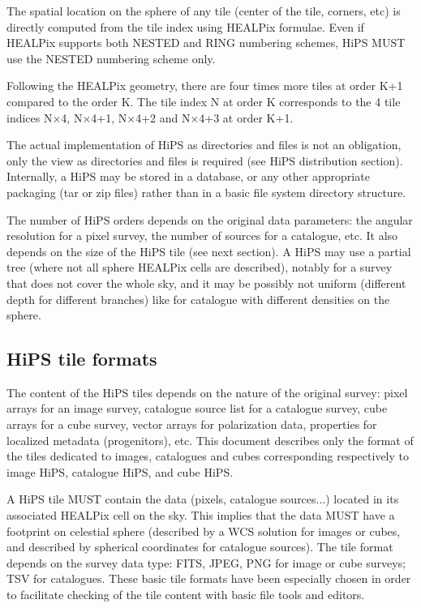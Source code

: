 \documentclass[11pt,a4paper]{ivoa}
\begin{document}
The spatial location on the sphere of any tile (center of the tile, corners, etc) is directly computed from the tile index using HEALPix formulae. Even if HEALPix supports both NESTED and RING numbering schemes, HiPS MUST use the NESTED numbering scheme only.

Following the HEALPix geometry, there are four times more tiles at order K+1 compared to the order K. The tile index N at order K corresponds to the 4 tile indices N×4, N×4+1, N×4+2 and N×4+3 at order K+1.

The actual implementation of HiPS as directories and files is not an obligation, only the view as directories and files is required (see HiPS distribution section). Internally, a HiPS may be stored in a database, or any other appropriate packaging (tar or zip files) rather than in a basic file system directory structure.

The number of HiPS orders depends on the original data parameters: the angular resolution for a pixel survey, the number of sources for a catalogue, etc. It also depends on the size of the HiPS tile (see next section). A HiPS may use a partial tree (where not all sphere HEALPix cells are described), notably for a survey that does not cover the whole sky, and it may be possibly not uniform (different depth for different branches) like for catalogue with different densities on the sphere.

\subsection{HiPS tile formats}

The content of the HiPS tiles depends on the nature of the original survey: pixel arrays for an image survey, catalogue source list for a catalogue survey, cube arrays for a cube survey, vector arrays for polarization data, properties for localized metadata (progenitors), etc. This document describes only the format of the tiles dedicated to images, catalogues and cubes corresponding respectively to image HiPS, catalogue HiPS, and cube HiPS.

A HiPS tile MUST contain the data (pixels, catalogue sources...) located in its associated HEALPix cell on the sky. This implies that the data MUST have a footprint on celestial sphere (described by a WCS solution for images or cubes, and described by spherical coordinates for catalogue sources). The tile format depends on the survey data type: FITS, JPEG, PNG for image or cube surveys; TSV for catalogues. These basic tile formats have been especially chosen in order to facilitate checking of the tile content with basic file tools and editors.
\end{document}
